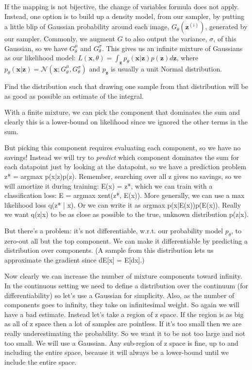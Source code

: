 If the mapping is not bijective, the change of variables formula does not apply. Instead, one option is to build up a density model, from our sampler, by putting a little blip of Gaussian probability around each image, $G_{\theta}(\mathbf{z}^{(i)})$, generated by our sampler. Commonly, we augment $G$ to also output the variance, $\sigma$, of this Gaussian, so we have $G^{\mu}_{\theta}$ and $G^{\sigma}_{\theta}$. This gives us an infinite mixture of Gaussians as our likelihood model: $L(\mathbf{x}, \theta) = \int_{\mathbf{z}} p_{\theta}(\mathbf{x} | \mathbf{z})p(\mathbf{z})d\mathbf{z}$, where $p_{\theta}(\mathbf{x} | \mathbf{z}) = \mathcal{N}(\mathbf{x}; G_{\theta}^{\mu}, G_{\theta}^{\sigma})$ and $p_{\mathbf{z}}$ is usually a unit Normal distribution.

Find the distribution such that drawing one sample from that distribution will be as good as possible an estimate of the integral.

With a finite mixture, we can pick the component that dominates the sum and clearly this is a lower-bound on likelihood since we ignored the other terms in the sum.

But picking this component requires evaluating each component, so we have no savings! Instead we will try to \textit{predict} which component dominates the sum for each datapoint just by looking at the datapoint, so we have a prediction problem z* = argmax p(x|z)p(z). Remember, searching over all z gives no savings, so we will amortize it during training: E(x) = z*, which we can train with a classification loss: E = argmax xent(z*, E(x)). More generally, we can use a max likelihood loss q(z* | x). Or we can write it as argmax p(x|E(x))p(E(x)). Really we want q(z|x) to be as close as possible to the true, unknown distribution p(z|x).

But there's a problem: it's not differentiable, w.r.t. our probability model $p_\theta$, to zero-out all but the top component. We can make it differentiable by predicting a distribution over components. (A sample from this distribution lets us approximate the gradient since dE[x] = E[dx].)

Now clearly we can increase the number of mixture components toward infinity. In the continuous setting we need to define a distribution over the continuum (for differentiability) so let's use a Gaussian for simplicity. Also, as the number of components goes to infinity, they take on infinitesimal weight. So again we will have a bad estimate. Instead let's take a region of z space. If the region is as big as all of z space then a lot of samples are pointless. If it's too small then we are really underestimating the probability. So we want it to be not too large and not too small. We will use a Gaussian. Any sub-region of z space is fine, up to and including the entire space, because it will always be a lower-bound until we include the entire space.

